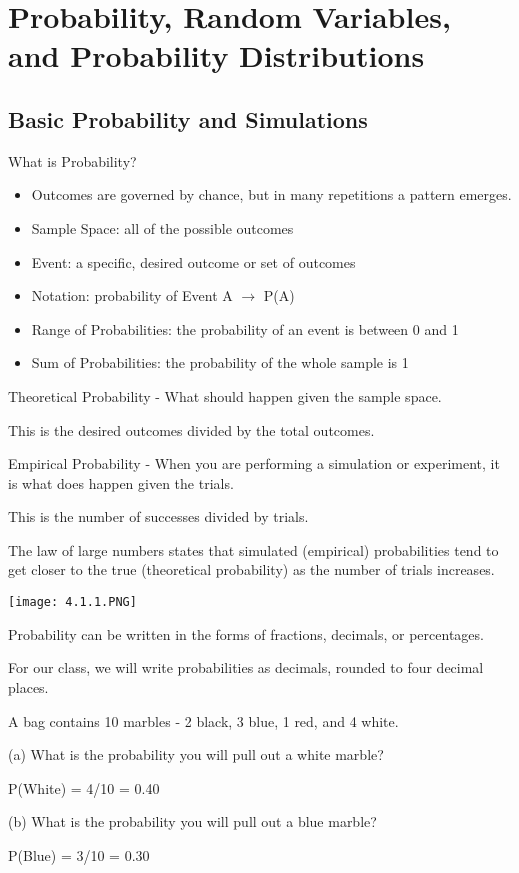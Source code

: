 \documentclass[../stats.tex]{subfiles}
\begin{document}
\chapter{Probability, Random Variables, and Probability Distributions}
\section{Basic Probability and Simulations}
What is Probability?
\begin{itemize}
    \item Outcomes are governed by chance, but in many repetitions a pattern emerges.
    \item Sample Space: all of the possible outcomes 
    \item Event: a specific, desired outcome or set of outcomes 
    \item Notation: probability of Event A $\rightarrow$ P(A)
    \item Range of Probabilities: the probability of an event is between 0 and 1 
    \item Sum of Probabilities: the probability of the whole sample is 1
\end{itemize}

Theoretical Probability - What should happen given the sample space.

This is the desired outcomes divided by the total outcomes.

Empirical Probability - When you are performing a simulation or experiment, it is what does happen given the trials.

This is the number of successes divided by trials.

The law of large numbers states that simulated (empirical) probabilities tend to get closer to the true (theoretical probability) as the number of trials increases.

\begin{center}
    \texttt{[image: 4.1.1.PNG]}
\end{center}
Probability can be written in the forms of fractions, decimals, or percentages.

For our class, we will write probabilities as decimals, rounded to four decimal places.

\pagebreak
\begin{example}
    A bag contains 10 marbles - 2 black, 3 blue, 1 red, and 4 white.

    (a) What is the probability you will pull out a white marble?

    P(White) = 4/10 = 0.40

    (b) What is the probability you will pull out a blue marble?

    P(Blue) = 3/10 = 0.30
\end{example}
\end{document}

